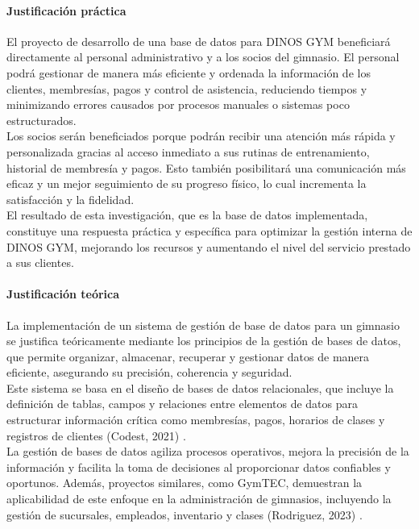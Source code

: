 \documentclass[12pt, letterpaper]{article}
\begin{document}
\paragraph{Justificación práctica}
El proyecto de desarrollo de una base de datos para DINOS GYM beneficiará directamente al personal administrativo y a los socios del gimnasio. El personal podrá gestionar de manera más eficiente y ordenada la información de los clientes, membresías, pagos y control de asistencia, reduciendo tiempos y minimizando errores causados por procesos manuales o sistemas poco estructurados.\\
Los socios serán beneficiados porque podrán recibir una atención más rápida y personalizada gracias al acceso inmediato a sus rutinas de entrenamiento, historial de membresía y pagos. Esto también posibilitará una comunicación más eficaz y un mejor seguimiento de su progreso físico, lo cual incrementa la satisfacción y la fidelidad.\\
El resultado de esta investigación, que es la base de datos implementada, constituye una respuesta práctica y específica para optimizar la gestión interna de DINOS GYM, mejorando los recursos y aumentando el nivel del servicio prestado a sus clientes.\\

\paragraph{Justificación teórica}
La implementación de un sistema de gestión de base de datos para un gimnasio se justifica teóricamente mediante los principios de la gestión de bases de datos, que permite organizar, almacenar, recuperar y gestionar datos de manera eficiente, asegurando su precisión, coherencia y seguridad.\\ 
Este sistema se basa en el diseño de bases de datos relacionales, que incluye la definición de tablas, campos y relaciones entre elementos de datos para estructurar información crítica como membresías, pagos, horarios de clases y registros de clientes (Codest, 2021) .\\
La gestión de bases de datos agiliza procesos operativos, mejora la precisión de la información y facilita la toma de decisiones al proporcionar datos confiables y oportunos. Además, proyectos similares, como GymTEC, demuestran la aplicabilidad de este enfoque en la administración de gimnasios, incluyendo la gestión de sucursales, empleados, inventario y clases (Rodriguez, 2023) .  
\end{document}
